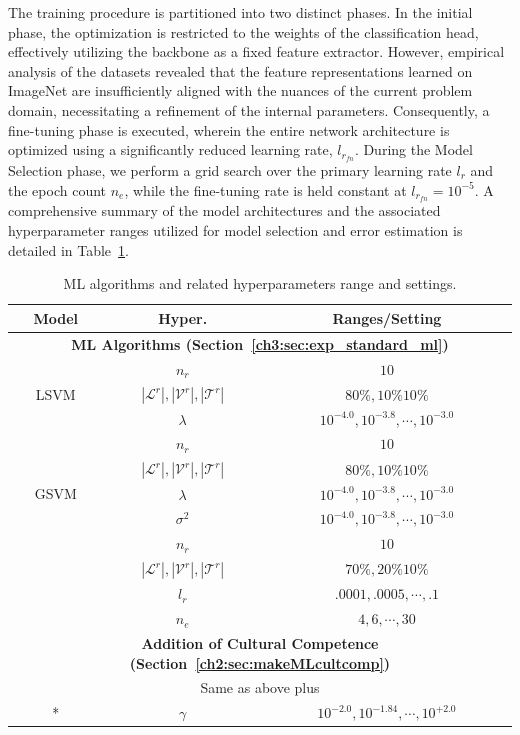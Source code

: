 The training procedure is partitioned into two distinct phases. 
In the initial phase, the optimization is restricted to the weights of the classification head, effectively utilizing the backbone as a fixed feature extractor. 
However, empirical analysis of the datasets revealed that the feature representations learned on ImageNet are insufficiently aligned with the nuances of the current problem domain, necessitating a refinement of the internal parameters.
Consequently, a fine-tuning phase is executed, wherein the entire network architecture is optimized using a significantly reduced learning rate, $l_{r_{fn}}$. 
During the Model Selection phase, we perform a grid search over the primary learning rate $l_r$ and the epoch count $n_e$, while the fine-tuning rate is held constant at $l_{r_{fn}} = 10^{-5}$.
A comprehensive summary of the model architectures and the associated hyperparameter ranges utilized for model selection and error estimation is detailed in Table~\ref{ch3:tab:hyper}.
%
\begin{table}
\footnotesize
\centering
\setlength{\tabcolsep}{0.1cm}
\renewcommand{\arraystretch}{1.5}
\centering
\begin{tabular}{c|c|c}
\toprule
\textbf{Model} & \textbf{Hyper.} & \textbf{Ranges/Setting} \\
\midrule
\multicolumn{3}{c}{\textbf{ML Algorithms (Section~\ref{ch3:sec:exp_standard_ml})}}\\
\midrule
\multirow{3}{*}{LSVM} & $n_r$ & $10$ \\
\hhline{~--}
& $|\mathcal{L}^r|, |\mathcal{V}^r|, |\mathcal{T}^r|$& $80\%, 10\% 10\%$ \\
\hhline{~--}
& $\lambda$ & $10^{-4.0},10^{-3.8}, \cdots, 10^{-3.0}$\\
\midrule
\multirow{5}{*}{GSVM} & $n_r$ & $10$ \\
\hhline{~--}
& $|\mathcal{L}^r|, |\mathcal{V}^r|, |\mathcal{T}^r|$& $80\%, 10\% 10\%$ \\
\hhline{~--}
& $\lambda$ & $10^{-4.0},10^{-3.8}, \cdots, 10^{-3.0}$\\
\hhline{~--}
& $\sigma^2$ & $10^{-4.0},10^{-3.8}, \cdots, 10^{-3.0}$\\
\midrule
\multirow{4}{*}{RESNET} & $n_r$ & $10$ \\
\hhline{~--}
& $|\mathcal{L}^r|, |\mathcal{V}^r|, |\mathcal{T}^r|$& $70\%, 20\% 10\%$ \\
\hhline{~--}
& $l_r$ & $.0001, .0005, \cdots, .1$\\
\hhline{~--}
& $n_e$ & $4,6, \cdots, 30$\\
\midrule
\multicolumn{3}{c}{\textbf{Addition of Cultural Competence (Section~\ref{ch2:sec:makeMLcultcomp})}}\\
\midrule
\multicolumn{3}{c}{Same as above plus}\\
* & $\gamma$ & $10^{-2.0},10^{-1.84}, \cdots, 10^{+2.0}$\\
\bottomrule
\end{tabular}
\caption{ML algorithms and related hyperparameters range and settings.}
\label{ch3:tab:hyper}
\end{table}
